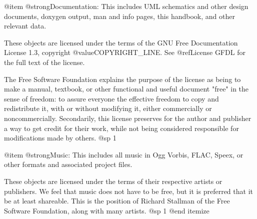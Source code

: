 @item
@strong{Documentation:} This includes UML schematics and other design documents, doxygen output, man and info pages, this handbook, and other relevant data.

These objects are licensed under the terms of the GNU Free Documentation License 1.3, copyright @value{COPYRIGHT_LINE}. See @ref{License GFDL} for the full text of the license.

The Free Software Foundation explains the purpose of the license as being to make a manual, textbook, or other functional and useful document "free" in the sense of freedom: to assure everyone the effective freedom to copy and redistribute it, with or without modifying it, either commercially or noncommercially. Secondarily, this license preserves for the author and publisher a way to get credit for their work, while not being considered responsible for modifications made by others.
@sp 1

@item
@strong{Music:} This includes all music in Ogg Vorbis, FLAC, Speex, or other formats and associated project files.

These objects are licensed under the terms of their respective artists or publishers. We feel that music does not have to be free, but it is preferred that it be at least shareable. This is the position of Richard Stallman of the Free Software Foundation, along with many artists.
@sp 1
@end itemize

